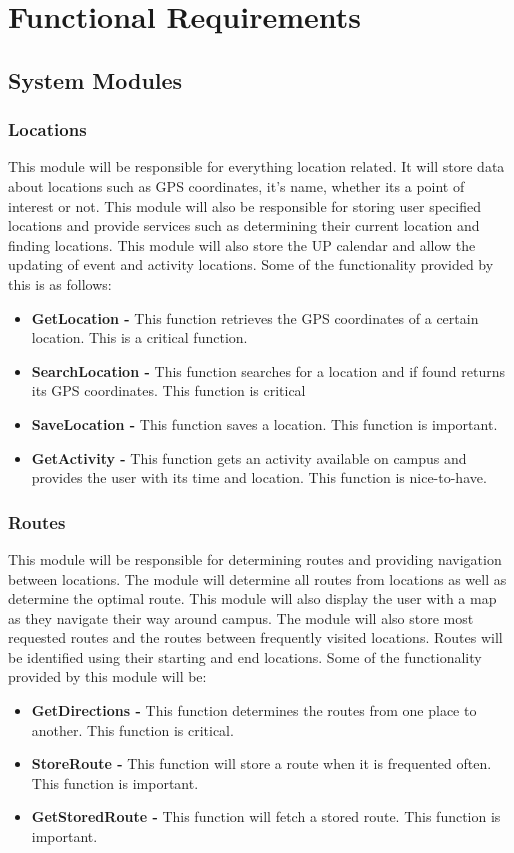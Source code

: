 \documentclass[a4paper,12pt]{article}
\begin{document}
\section{Functional Requirements}

\subsection{System Modules}
\subsubsection{Locations}
This module will be responsible for everything location related. It will store data about locations such as GPS coordinates, it's name, whether its a point of interest or not. This module will also be responsible for storing user specified locations and provide services such as determining their current location and finding locations. This module will also store the UP calendar and allow the updating of event and activity locations. Some of the functionality provided by this is as follows:
\begin{itemize}
\item \textbf{GetLocation -} This function retrieves the GPS coordinates of a certain location. This is a critical function.
\item \textbf{SearchLocation -} This function searches for a location and if found returns its GPS coordinates. This function is critical
\item \textbf{SaveLocation -} This function saves a location. This function is important.
\item \textbf{GetActivity -} This function gets an activity available on campus and provides the user with its time and location. This function is nice-to-have.
\end{itemize}

\subsubsection{Routes}
This module will be responsible for determining routes and providing navigation between locations. The module will determine all routes from locations as well as determine the optimal route. This module will also display the user with a map as they navigate their way around campus. The module will also store most requested routes and the routes between frequently visited locations. Routes will be identified using their starting and end locations. Some of the functionality provided by this module will be:
\begin{itemize}
\item \textbf{GetDirections -} This function determines the routes from one place to another. This function is critical.
\item \textbf{StoreRoute - } This function will store a route when it is frequented often. This function is important.
\item \textbf{GetStoredRoute - } This function will fetch a stored route. This function is important.
\end{itemize}
\end{document}
